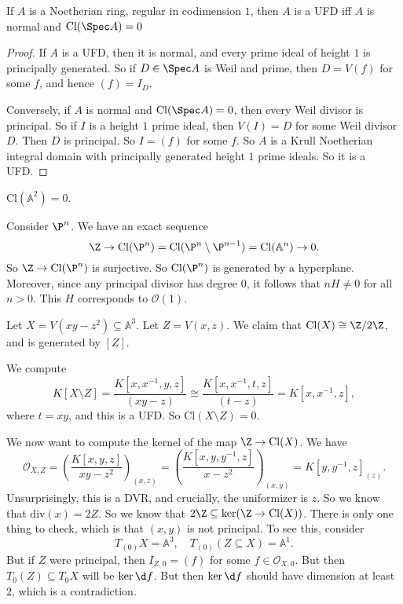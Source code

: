 \documentclass[a4paper]{article}
\newcommand\A{\mathbb{A}}
\renewcommand\div{\mathrm{div}}
\newcommand\Cl{\mathrm{Cl}}
\begin{document}
\begin{prop}
  If $A$ is a Noetherian ring, regular in codimension $1$, then $A$ is a UFD iff $A$ is normal and $\Cl(\Spec A) = 0$
\end{prop}

\begin{proof}
  If $A$ is a UFD, then it is normal, and every prime ideal of height $1$ is principally generated. So if $D \in \Spec A$ is Weil and prime, then $D = V(f)$ for some $f$, and hence $(f) = I_D$.

  Conversely, if $A$ is normal and $\Cl(\Spec A) = 0$, then every Weil divisor is principal. So if $I$ is a height $1$ prime ideal, then $V(I) = D$ for some Weil divisor $D$. Then $D$ is principal. So $I = (f)$ for some $f$. So $A$ is a Krull Noetherian integral domain with principally generated height $1$ prime ideals. So it is a UFD.
\end{proof}

\begin{eg}
  $\Cl(\A^2) = 0$.
\end{eg}

\begin{eg}
  Consider $\P^n$. We have an exact sequence
  \[
    \Z \to \Cl(\P^n) = \Cl(\P^n \setminus \P^{n - 1}) = \Cl(\A^n) \to 0.
  \]
  So $\Z \to \Cl(\P^n)$ is surjective. So $\Cl(\P^n)$ is generated by a hyperplane. Moreover, since any principal divisor has degree $0$, it follows that $nH \not= 0$ for all $n > 0$. This $H$ corresponds to $\mathcal{O}(1)$.
\end{eg}

\begin{eg}
  Let $X = V(xy - z^2) \subseteq \A^3$. Let $Z = V(x, z)$. We claim that $\Cl(X) \cong \Z/2\Z$, and is generated by $[Z]$.

  We compute
  \[
    K[X \setminus Z] = \frac{K[x, x^{-1}, y, z]}{(xy - z)} \cong \frac{K[x, x^{-1}, t, z]}{(t - z)} = K[x, x^{-1}, z],
  \]
  where $t = xy$, and this is a UFD. So $\Cl(X \setminus Z) = 0$.

  We now want to compute the kernel of the map $\Z \to \Cl(X)$. We have
  \[
    \mathcal{O}_{X, Z} = \left(\frac{K[x, y, z]}{xy - z^2}\right)_{(x, z)} = \left(\frac{K[x, y, y^{-1}, z]}{x - z^2}\right)_{(x, y)} = K[y, y^{-1}, z]_{(z)}.
  \]
  Unsurprisingly, this is a DVR, and crucially, the uniformizer is $z$. So we know that $\div(x) = 2Z$. So we know that $2\Z \subseteq \ker(\Z \to \Cl(X))$. There is only one thing to check, which is that $(x, y)$ is not principal. To see this, consider
  \[
    T_{(0)}X = \A^3,\quad T_{(0)} (Z \subseteq X) = \A^1.
  \]
  But if $Z$ were principal, then $I_{Z, 0} = (f)$ for some $f \in \mathcal{O}_{X, 0}$. But then $T_0(Z) \subseteq T_0 X$ will be $\ker \d f$. But then $\ker \d f$ should have dimension at least $2$, which is a contradiction.
\end{eg}
\end{document}
